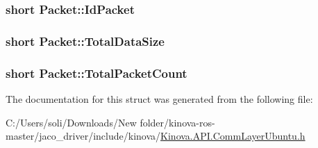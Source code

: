 \subsubsection[{\texorpdfstring{Id\+Packet}{IdPacket}}]{\setlength{\rightskip}{0pt plus 5cm}short Packet\+::\+Id\+Packet}\hypertarget{struct_packet_af74e2cb3038d19a97729f6e6bf1e8e93}{}\label{struct_packet_af74e2cb3038d19a97729f6e6bf1e8e93}
\subsubsection[{\texorpdfstring{Total\+Data\+Size}{TotalDataSize}}]{\setlength{\rightskip}{0pt plus 5cm}short Packet\+::\+Total\+Data\+Size}\hypertarget{struct_packet_a1f7f00740719cb05e71795512c70657b}{}\label{struct_packet_a1f7f00740719cb05e71795512c70657b}
\subsubsection[{\texorpdfstring{Total\+Packet\+Count}{TotalPacketCount}}]{\setlength{\rightskip}{0pt plus 5cm}short Packet\+::\+Total\+Packet\+Count}\hypertarget{struct_packet_a146c0888f5e5e591735df01d1b627ae6}{}\label{struct_packet_a146c0888f5e5e591735df01d1b627ae6}


The documentation for this struct was generated from the following file\+:\begin{DoxyCompactItemize}
\item 
C\+:/\+Users/soli/\+Downloads/\+New folder/kinova-\/ros-\/master/jaco\+\_\+driver/include/kinova/\hyperlink{_kinova_8_a_p_i_8_comm_layer_ubuntu_8h}{Kinova.\+A\+P\+I.\+Comm\+Layer\+Ubuntu.\+h}\end{DoxyCompactItemize}

